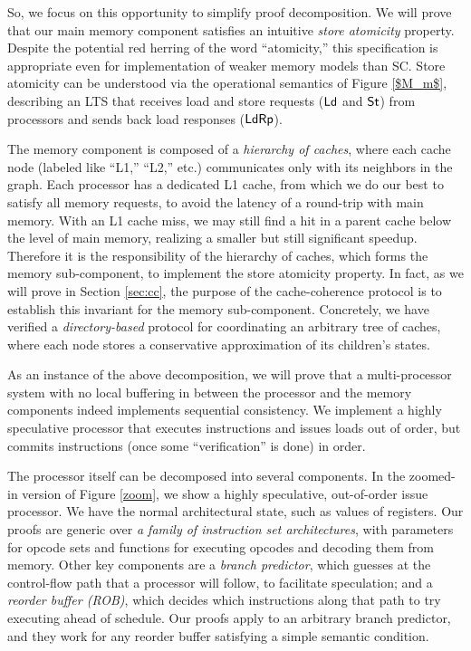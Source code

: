 So, we focus on this opportunity to simplify proof decomposition.  We
will prove that our main memory component satisfies an intuitive
\emph{store atomicity} property.  Despite the potential red herring of
the word ``atomicity,'' this specification is appropriate even for
implementation of weaker memory models than SC.  Store atomicity can
be understood via the operational semantics of Figure \ref{$M_m$},
describing an LTS that receives load and store requests ($\mathsf{Ld}$ and
$\mathsf{St}$) from processors and sends back load responses ($\mathsf{Ld}\mathsf{Rp}$).

The memory component is composed of a \emph{hierarchy of caches}, where each
cache node (labeled like ``L1,'' ``L2,'' etc.) communicates only with its
neighbors in the graph.  Each processor has a dedicated L1 cache, from which we
do our best to satisfy all memory requests, to avoid the latency of a
round-trip with main memory.  With an L1 cache miss, we may still find a hit in
a parent cache below the level of main memory, realizing a smaller but still
significant speedup.  Therefore it is the responsibility of the hierarchy of
caches, which forms the memory sub-component, to implement the store atomicity
property. In fact, as we will prove in Section \ref{sec:cc}, the purpose of the
cache-coherence protocol is to establish this invariant for the memory
sub-component.  Concretely, we have verified a \emph{directory-based} protocol
for coordinating an arbitrary tree of caches, where each node stores a
conservative approximation of its children's states.

As an instance of the above decomposition, we will prove that a multi-processor
system with no local buffering in between the processor and the memory
components indeed implements sequential consistency. We implement a highly
speculative processor that executes instructions and issues loads out of
order, but commits instructions (once some ``verification'' is done) in order.

The processor itself can be decomposed into several components. In the zoomed-in
version of Figure \ref{zoom}, we show a highly speculative, out-of-order
issue processor. We have the normal architectural state, such as values of
registers.  Our proofs are generic over \emph{a family of instruction set
architectures}, with parameters for opcode sets and functions for executing
opcodes and decoding them from memory.  Other key components are a \emph{branch
predictor}, which guesses at the control-flow path that a processor will
follow, to facilitate speculation; and a \emph{reorder buffer (ROB)}, which
decides which instructions along that path to try executing ahead of schedule.
Our proofs apply to an arbitrary branch predictor, and they work for any
reorder buffer satisfying a simple semantic condition.

